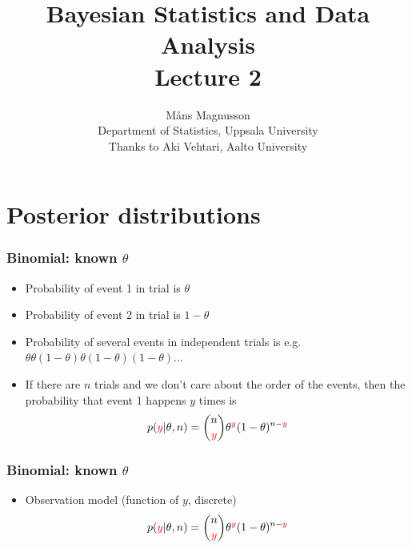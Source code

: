 \documentclass[10pt]{beamer}
\title[]{{\color{black}Bayesian Statistics and Data Analysis \\ Lecture 2}}
\author[]{M{\aa}ns Magnusson \\ Department of Statistics, Uppsala University \\ Thanks to Aki Vehtari, Aalto University}
\date{}
\begin{document}
\frame{\titlepage
}



\section{Posterior distributions}

\begin{frame}
  \frametitle{Binomial: known $\theta$}

  \begin{itemize}
  \item Probability of event 1 in trial is $\theta$
  \item<2-> Probability of event 2 in trial is $1-\theta$
  \item<3-> Probability of several events in independent trials is e.g.\\
    $\theta\theta(1-\theta)\theta(1-\theta)(1-\theta)\ldots$
  \item<4-> If there are $n$ trials and we don't care about the order
    of the events, then the probability that event 1 happens {\color{red}$y$} times
    is
    \begin{align*}
      p({\color{red}y}|\theta,n) = \binom{n}{{\color{red}y}} \theta^{\color{red}y}(1-\theta)^{n-{\color{red}y}}
    \end{align*}
  \end{itemize}

\end{frame}

\begin{frame}
  \frametitle{Binomial: known $\theta$}

  \begin{itemize}
  \item {\color{blue}Observation model} (function of {\color{red} $y$}, discrete)
    \begin{align*}
      p({\color{red}y}|\theta,n) = \binom{n}{{\color{red}y}} \theta^{\color{red}y}(1-\theta)^{n-{\color{red}y}}
    \end{align*}
  \end{itemize}

  \begin{center}
  \end{center}
\end{frame}
\end{document}
